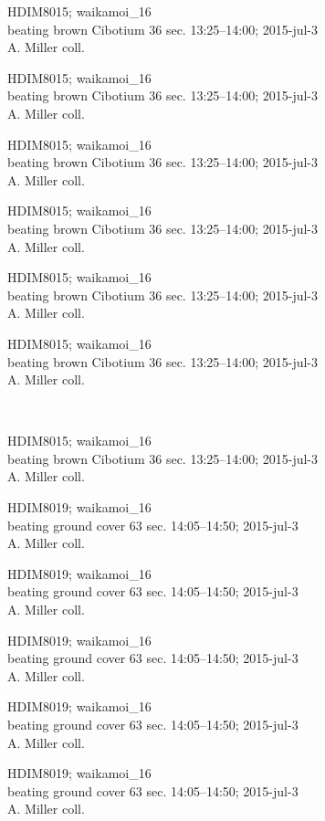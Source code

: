 \documentclass[2pt]{extarticle}
\begin{document}
\noindent
\parbox{0.16\textwidth}{\tiny \raggedright \rule[-0.3\baselineskip]{0pt}{10pt}HDIM8015; waikamoi\_16\\ beating brown Cibotium 36 sec. 13:25--14:00; 2015-jul-3\\ A. Miller coll.}
\parbox{0.16\textwidth}{\tiny \raggedright \rule[-0.3\baselineskip]{0pt}{10pt}HDIM8015; waikamoi\_16\\ beating brown Cibotium 36 sec. 13:25--14:00; 2015-jul-3\\ A. Miller coll.}
\parbox{0.16\textwidth}{\tiny \raggedright \rule[-0.3\baselineskip]{0pt}{10pt}HDIM8015; waikamoi\_16\\ beating brown Cibotium 36 sec. 13:25--14:00; 2015-jul-3\\ A. Miller coll.}
\parbox{0.16\textwidth}{\tiny \raggedright \rule[-0.3\baselineskip]{0pt}{10pt}HDIM8015; waikamoi\_16\\ beating brown Cibotium 36 sec. 13:25--14:00; 2015-jul-3\\ A. Miller coll.}
\parbox{0.16\textwidth}{\tiny \raggedright \rule[-0.3\baselineskip]{0pt}{10pt}HDIM8015; waikamoi\_16\\ beating brown Cibotium 36 sec. 13:25--14:00; 2015-jul-3\\ A. Miller coll.}
\parbox{0.16\textwidth}{\tiny \raggedright \rule[-0.3\baselineskip]{0pt}{10pt}HDIM8015; waikamoi\_16\\ beating brown Cibotium 36 sec. 13:25--14:00; 2015-jul-3\\ A. Miller coll.} \\ 
\vspace{0.001in} 

\noindent
\parbox{0.16\textwidth}{\tiny \raggedright \rule[-0.3\baselineskip]{0pt}{10pt}HDIM8015; waikamoi\_16\\ beating brown Cibotium 36 sec. 13:25--14:00; 2015-jul-3\\ A. Miller coll.}
\parbox{0.16\textwidth}{\tiny \raggedright \rule[-0.3\baselineskip]{0pt}{10pt}HDIM8019; waikamoi\_16\\ beating ground cover 63 sec. 14:05--14:50; 2015-jul-3\\ A. Miller coll.}
\parbox{0.16\textwidth}{\tiny \raggedright \rule[-0.3\baselineskip]{0pt}{10pt}HDIM8019; waikamoi\_16\\ beating ground cover 63 sec. 14:05--14:50; 2015-jul-3\\ A. Miller coll.}
\parbox{0.16\textwidth}{\tiny \raggedright \rule[-0.3\baselineskip]{0pt}{10pt}HDIM8019; waikamoi\_16\\ beating ground cover 63 sec. 14:05--14:50; 2015-jul-3\\ A. Miller coll.}
\parbox{0.16\textwidth}{\tiny \raggedright \rule[-0.3\baselineskip]{0pt}{10pt}HDIM8019; waikamoi\_16\\ beating ground cover 63 sec. 14:05--14:50; 2015-jul-3\\ A. Miller coll.}
\parbox{0.16\textwidth}{\tiny \raggedright \rule[-0.3\baselineskip]{0pt}{10pt}HDIM8019; waikamoi\_16\\ beating ground cover 63 sec. 14:05--14:50; 2015-jul-3\\ A. Miller coll.} \\ 
\vspace{0.001in} 
\end{document}

